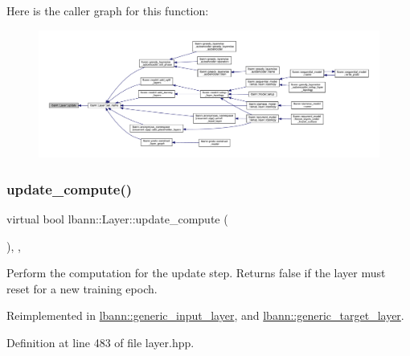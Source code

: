 Here is the caller graph for this function\+:\nopagebreak
\begin{figure}[H]
\begin{center}
\leavevmode
\includegraphics[width=350pt]{classlbann_1_1Layer_ae4a050e51e3a9bec431cf8b7a5660f2c_icgraph}
\end{center}
\end{figure}
\mbox{\label{classlbann_1_1Layer_a70e08fc96a612f67ade6ba3809536d85}} 
\subsubsection{\texorpdfstring{update\+\_\+compute()}{update\_compute()}}
{\footnotesize\ttfamily virtual bool lbann\+::\+Layer\+::update\+\_\+compute (\begin{DoxyParamCaption}{ }\end{DoxyParamCaption})\hspace{0.3cm}{\ttfamily [inline]}, {\ttfamily [protected]}, {\ttfamily [virtual]}}

Perform the computation for the update step. Returns false if the layer must reset for a new training epoch. 

Reimplemented in \hyperlink{classlbann_1_1generic__input__layer_aaf9ac19f7dd725230bde87d859ec0f35}{lbann\+::generic\+\_\+input\+\_\+layer}, and \hyperlink{classlbann_1_1generic__target__layer_a43f4de7c1846b605aa9bb6daf9338c78}{lbann\+::generic\+\_\+target\+\_\+layer}.



Definition at line 483 of file layer.\+hpp.


